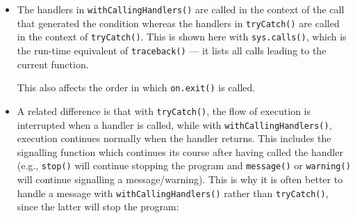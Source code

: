 \begin{itemize}
\item
  The handlers in \texttt{withCallingHandlers()} are called in the
  context of the call that generated the condition whereas the handlers
  in \texttt{tryCatch()} are called in the context of
  \texttt{tryCatch()}. This is shown here with \texttt{sys.calls()},
  which is the run-time equivalent of \texttt{traceback()} --- it lists
  all calls leading to the current function.

\begin{Shaded}
\begin{Highlighting}[]
\StringTok{ }\NormalTok{() }\NormalTok{()}
\StringTok{ }\NormalTok{() }\NormalTok{()}
\StringTok{ }\NormalTok{() }\NormalTok{(}\NormalTok{)}

\NormalTok{(}\NormalTok{(), } \NormalTok{(}\NormalTok{()))}

\NormalTok{(}\NormalTok{(), } \NormalTok{(}\NormalTok{()))}
\end{Highlighting}
\end{Shaded}

  This also affects the order in which \texttt{on.exit()} is called.
\item
  A related difference is that with \texttt{tryCatch()}, the flow of
  execution is interrupted when a handler is called, while with
  \texttt{withCallingHandlers()}, execution continues normally when the
  handler returns. This includes the signalling function which continues
  its course after having called the handler (e.g., \texttt{stop()} will
  continue stopping the program and \texttt{message()} or
  \texttt{warning()} will continue signalling a message/warning). This
  is why it is often better to handle a message with
  \texttt{withCallingHandlers()} rather than \texttt{tryCatch()}, since
  the latter will stop the program:


\end{itemize}
